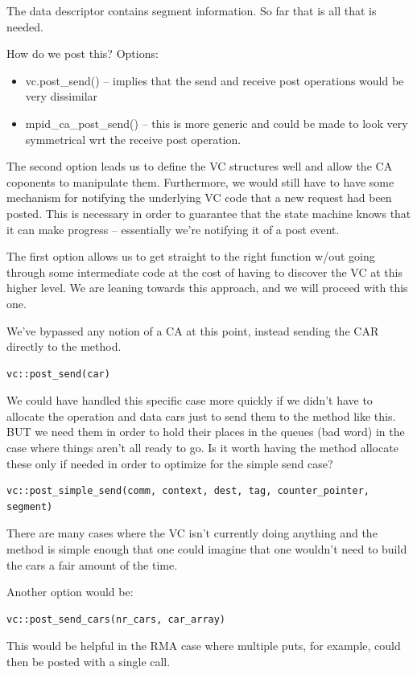 \documentclass[11pt,letterpaper]{article}
\begin{document}
The data descriptor contains segment information.  So far that is all that is
needed.

How do we post this?  Options:
\begin{itemize}
\item vc.post\_send() -- implies that the send and receive post operations would
  be very dissimilar
\item mpid\_ca\_post\_send() -- this is more generic and could be made to look
  very symmetrical wrt the receive post operation.
\end{itemize}

The second option leads us to define the VC structures well and allow the CA
coponents to manipulate them.  Furthermore, we would still have to have some
mechanism for notifying the underlying VC code that a new request had been
posted.  This is necessary in order to guarantee that the state machine knows
that it can make progress -- essentially we're notifying it of a post event.

The first option allows us to get straight to the right function w/out going
through some intermediate code at the cost of having to discover the VC at this
higher level.  We are leaning towards this approach, and we will proceed with
this one.

We've bypassed any notion of a CA at this point, instead sending the CAR
directly to the method.

\begin{verbatim}
vc::post_send(car)
\end{verbatim}

We could have handled this specific case more quickly if we didn't have to allocate the operation and data cars just to send them to the method like this.  BUT we need them in order to hold their places in the queues (bad word) in the case where things aren't all ready to go.  Is it worth having the method allocate these only if needed in order to optimize for the simple send case?

\begin{verbatim}
vc::post_simple_send(comm, context, dest, tag, counter_pointer, segment)
\end{verbatim}
There are many cases where the VC isn't currently doing anything and the method
is simple enough that one could imagine that one wouldn't need to build the
cars a fair amount of the time.

Another option would be:
\begin{verbatim}
vc::post_send_cars(nr_cars, car_array)
\end{verbatim}
This would be helpful in the RMA case where multiple puts, for example, could
then be posted with a single call.
\end{document}
